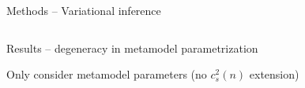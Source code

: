 \documentclass[usenames,dvipsnames,t]{beamer}
\begin{document}
\begin{frame}{Methods -- Variational inference}
\begin{columns}
  \end{columns}
\end{frame}

\begin{frame}{Results -- degeneracy in metamodel parametrization}

  Only consider metamodel parameters (no $c_s^2(n)$ extension)
  
\end{frame}
\end{document}
